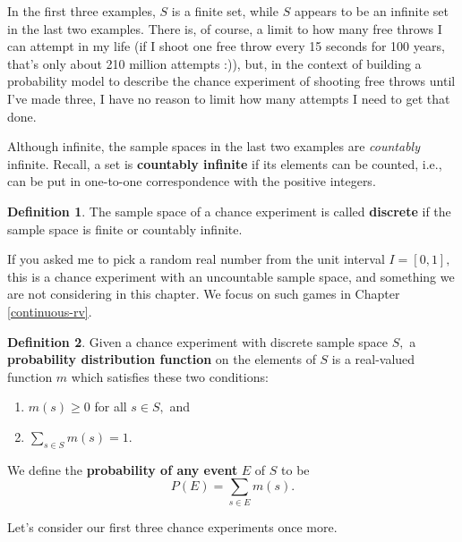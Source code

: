 \documentclass[
]{book}
\providecommand{\tightlist}{%
  \setlength{\itemsep}{0pt}\setlength{\parskip}{0pt}}
\theoremstyle{definition}
\newtheorem{definition}{Definition}[chapter]
\theoremstyle{definition}
\theoremstyle{definition}
\theoremstyle{definition}
\theoremstyle{remark}
\begin{document}
In the first three examples, \(S\) is a finite set, while \(S\) appears to be an infinite set in the last two examples. There is, of course, a limit to how many free throws I can attempt in my life (if I shoot one free throw every 15 seconds for 100 years, that's only about 210 million attempts :)), but, in the context of building a probability model to describe the chance experiment of shooting free throws until I've made three, I have no reason to limit how many attempts I need to get that done.

Although infinite, the sample spaces in the last two examples are \emph{countably} infinite. Recall, a set is \textbf{countably infinite} if its elements can be counted, i.e., can be put in one-to-one correspondence with the positive integers.

\begin{definition}
\protect\hypertarget{def:discrete-sample-space}{}\label{def:discrete-sample-space}The sample space of a chance experiment is called \textbf{discrete} if the sample space is finite or countably infinite.
\end{definition}

If you asked me to pick a random real number from the unit interval \(I = [0,1],\) this is a chance experiment with an uncountable sample space, and something we are not considering in this chapter. We focus on such games in Chapter \ref{continuous-rv}.

\begin{definition}
\protect\hypertarget{def:probability-distribution-function}{}\label{def:probability-distribution-function}Given a chance experiment with discrete sample space \(S,\) a \textbf{probability distribution function} on the elements of \(S\) is a real-valued function \(m\) which satisfies these two conditions:

\begin{enumerate}
\def\labelenumi{\arabic{enumi}.}
\tightlist
\item
  \(m(s) \geq 0\) for all \(s \in S,\) and
\item
  \(\displaystyle \sum_{s \in S} m(s) = 1.\)
\end{enumerate}

We define the \textbf{probability of any event} \(E\) of \(S\) to be \[P(E) = \sum_{s \in E} m(s).\]
\end{definition}

Let's consider our first three chance experiments once more.
\end{document}
